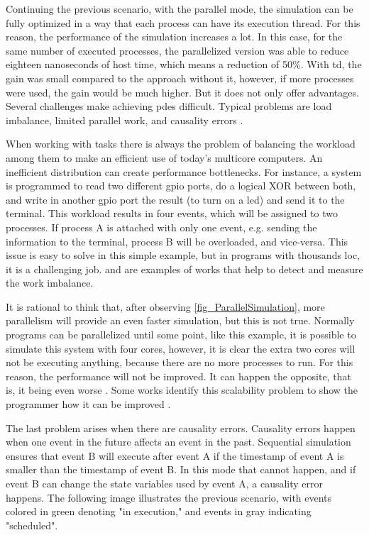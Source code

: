 Continuing the previous scenario, with the parallel mode, the simulation can be fully optimized in a way that each process can have its 
execution thread. For this reason, the performance of the simulation increases a lot. In this case, for the same number of executed processes, 
the parallelized version was able to reduce eighteen nanoseconds of host time, which means a reduction of 50\%. With \gls{td}, the gain was 
small compared to the approach without it, however, if more processes were used, the gain would be much higher. But it does not only offer 
advantages. Several challenges make achieving \gls{pdes} difficult. Typical problems are load imbalance, limited parallel work, and causality 
errors \cite{yoga2019parallelism} \cite{zhou1992sequential}. 

When working with tasks there is always the problem of balancing the workload among them to make an efficient use of today's multicore 
computers. An inefficient distribution can create performance bottlenecks. For instance, a system is programmed to read two different 
\gls{gpio} ports, do a logical XOR between both, and write in another \gls{gpio} port the result (to turn on a \gls{led}) and send it to 
the terminal. This workload results in four events, which will be assigned to two processes. If process A is attached with only one event, 
e.g. sending the information to the terminal, process B will be overloaded, and vice-versa. This issue is easy to solve in this simple 
example, but in programs with thousands \gls{loc}, it is a challenging job. \cite{loadImbalance1} and \cite{loadImbalance2} are examples of 
works that help to detect and measure the work imbalance.

It is rational to think that, after observing \autoref{fig_ParallelSimulation}, more parallelism will provide an even faster simulation, but 
this is not true. Normally programs can be parallelized until some point, like this example, it is possible to simulate this system with four 
cores, however, it is clear the extra two cores will not be executing anything, because there are no more processes to run. For this reason, 
the performance will not be improved. It can happen the opposite, that is, it being even worse \cite{scabilityIssue}. Some works identify 
this scalability problem to show the programmer how it can be improved \cite{scalabilityProblem} \cite{scalabilityProblem2}.

The last problem arises when there are causality errors. Causality errors happen when one event in the future affects an event in the past. 
Sequential simulation ensures that event B will execute after event A if the timestamp of event A is smaller than the timestamp of event B. 
In this mode that cannot happen, and if event B can change the state variables used by event A, a causality error happens. The following image 
illustrates the previous scenario, with events colored in green denoting "in execution," and events in gray indicating "scheduled".

